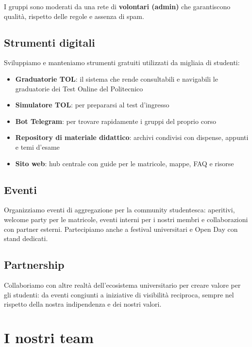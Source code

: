 \documentclass[report]{core/polinetwork}
\begin{document}
I gruppi sono moderati da una rete di \textbf{volontari (admin)} che
garantiscono qualità, rispetto delle regole e assenza di spam.

\subsection{Strumenti digitali}

Sviluppiamo e manteniamo strumenti gratuiti utilizzati da migliaia
di studenti:

\begin{itemize}
  \item \textbf{Graduatorie TOL}: il sistema che rende consultabili
    e navigabili le graduatorie dei Test Online del Politecnico
  \item \textbf{Simulatore TOL}: per prepararsi al test d'ingresso
  \item \textbf{Bot Telegram}: per trovare rapidamente i gruppi del
    proprio corso
  \item \textbf{Repository di materiale didattico}: archivi condivisi
    con dispense, appunti e temi d'esame
  \item \textbf{Sito web}: hub centrale con guide per le matricole,
    mappe, FAQ e risorse
\end{itemize}

\subsection{Eventi}

Organizziamo eventi di aggregazione per la community studentesca:
aperitivi, welcome party per le matricole, eventi interni per i
nostri membri e collaborazioni con partner esterni. Partecipiamo
anche a festival universitari e Open Day con stand dedicati.

\subsection{Partnership}

Collaboriamo con altre realtà dell'ecosistema universitario per
creare valore per gli studenti: da eventi congiunti a iniziative
di visibilità reciproca, sempre nel rispetto della nostra
indipendenza e dei nostri valori.

\section{I nostri team}
\end{document}
